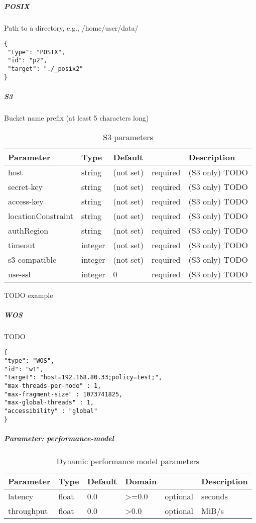 \subparagraph{POSIX}

Path to a directory, e.g., /home/user/data/

\begin{lstlisting}
{
 "type": "POSIX",
 "id": "p2",
 "target": "./_posix2"
}
\end{lstlisting}

\subparagraph{S3}
Bucket name prefix (at least 5 characters long)

\begin{table}[!h]
  \centering
  \begin{tabularx}{\textwidth}{llllX}
  Parameter              & Type    & Default    &          & Description \\
  \hline
  host                   & string  & (not set)  & required & (S3 only) TODO \\
  secret-key             & string  & (not set)  & required & (S3 only) TODO \\
  access-key             & string  & (not set)  & required & (S3 only) TODO \\
  locationConstraint     & string  & (not set)  & required & (S3 only) TODO \\
  authRegion             & string  & (not set)  & required & (S3 only) TODO \\
  timeout                & integer & (not set)  & required & (S3 only) TODO \\
  s3-compatible          & integer & (not set)  & required & (S3 only) TODO \\
  use-ssl                & integer & 0          & required & (S3 only) TODO \\
  \end{tabularx}
  \caption{S3 parameters}%
  \label{tab:s3_params}
\end{table}

TODO example

\subparagraph{WOS}
TODO

\begin{lstlisting}
{
"type": "WOS",
"id": "w1",
"target": "host=192.168.80.33;policy=test;",
"max-threads-per-node" : 1,
"max-fragment-size" : 1073741825,
"max-global-threads" : 1,
"accessibility" : "global"
}
\end{lstlisting}


\subparagraph{Parameter: performance-model}


\begin{table}[!ht]
  \centering
  \begin{tabularx}{\textwidth}{lllllX}
    Parameter  & Type  & Default & Domain &          & Description \\ 
    \hline
    latency    & float & 0.0     & >=0.0  & optional & seconds     \\ 
    throughput & float & 0.0     & >0.0   & optional & MiB/s       \\ 
  \end{tabularx}
  \caption{Dynamic performance model parameters}%
  \label{tab:dyn_perf_model_conf_params}
\end{table}


